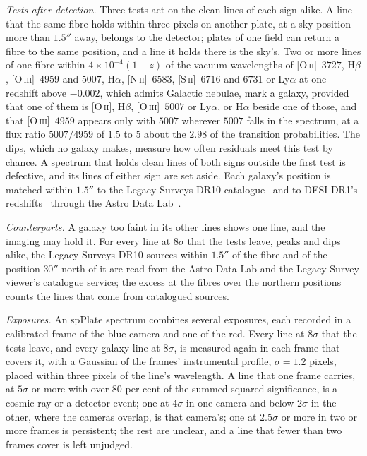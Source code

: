 \documentclass[3p,11pt]{elsarticle}
\begin{document}
\emph{Tests after detection.} Three tests act on the clean lines of each sign alike. A
line that the same fibre holds within three pixels on another plate, at a sky position
more than $1.5''$ away, belongs to the detector; plates of one field can return a fibre
to the same position, and a line it holds there is the sky's. Two or more lines of one
fibre within $4\times10^{-4}(1+z)$ of the vacuum wavelengths of
[O\,\textsc{ii}]~$3727$, H$\beta$, [O\,\textsc{iii}]~$4959$ and $5007$, H$\alpha$,
[N\,\textsc{ii}]~$6583$, [S\,\textsc{ii}]~$6716$ and $6731$ or Ly$\alpha$ at one redshift
above $-0.002$, which admits Galactic nebulae, mark a galaxy, provided that one of them is
[O\,\textsc{ii}], H$\beta$, [O\,\textsc{iii}]~$5007$ or Ly$\alpha$, or H$\alpha$ beside
one of those, and that [O\,\textsc{iii}]~$4959$ appears only with $5007$ wherever $5007$
falls in the spectrum, at a flux ratio $5007/4959$ of $1.5$ to $5$ about the $2.98$ of the
transition probabilities. The dips, which no galaxy makes, measure how often residuals meet
this test by chance. A spectrum that holds clean lines of both signs outside the first test
is defective, and its lines of either sign are set aside. Each galaxy's position is
matched within $1.5''$ to the Legacy Surveys DR10 catalogue~\cite{Dey2019} and to DESI
DR1's redshifts~\cite{DESI2025} through the Astro Data Lab~\cite{Fitzpatrick2014}.

\emph{Counterparts.} A galaxy too faint in its other lines shows one line, and the
imaging may hold it. For every line at $8\sigma$ that the tests leave, peaks and dips
alike, the Legacy Surveys DR10 sources within $1.5''$ of the fibre and of the position
$30''$ north of it are read from the Astro Data Lab and the Legacy Survey viewer's
catalogue service; the excess at the fibres over the northern positions counts the lines
that come from catalogued sources.

\emph{Exposures.} An spPlate spectrum combines several exposures, each recorded in a
calibrated frame of the blue camera and one of the red. Every line at $8\sigma$ that the
tests leave, and every galaxy line at $8\sigma$, is measured again in each frame that
covers it, with a Gaussian of the frames' instrumental profile, $\sigma=1.2$ pixels,
placed within three pixels of the line's wavelength. A line that one frame carries, at
$5\sigma$ or more with over $80$ per cent of the summed squared significance, is a cosmic
ray or a detector event; one at $4\sigma$ in one camera and below $2\sigma$ in the other,
where the cameras overlap, is that camera's; one at $2.5\sigma$ or more in two or more
frames is persistent; the rest are unclear, and a line that fewer than two frames cover
is left unjudged.
\end{document}
